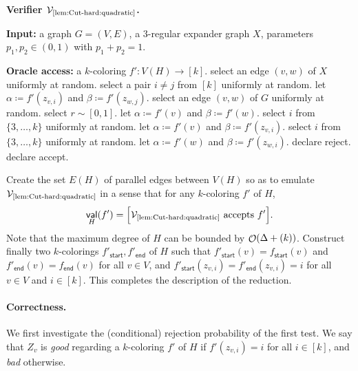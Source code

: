 \documentclass[11pt,fleqn]{article}
\renewcommand{\leq}{\leqslant}
\newcommand{\defeq}{\coloneq}
\DeclareMathOperator{\bigO}{\mathcal{O}}
\DeclareMathOperator{\val}{\mathsf{val}}
\let\poly\relax\DeclareMathOperator*{\poly}{\mathrm{poly}}
\newcommand{\sss}{\mathsf{start}}
\newcommand{\ttt}{\mathsf{end}}
\newcommand{\V}{\calV}
\newcommand{\Accept}{\textsf{accept}\xspace}
\newcommand{\Reject}{\textsf{reject}\xspace}
\newcommand{\f}{f}
\newcommand{\Vquad}{\V_{\text{\ref{lem:Cut-hard:quadratic}}}}
\newcommand{\calV}{\mathcal{V}}
\let\Pr\relax\DeclareMathOperator*{\Pr}{\mathbb{P}}
\theoremstyle{definition}
\numberwithin{equation}{section}
\begin{document}
\begin{itembox}[l]{\textbf{Verifier $\Vquad$.}}
\begin{algorithmic}[1]
    \item[\textbf{Input:}]
        a graph $G = (V,E)$,
        a $3$-regular expander graph $X$,
        parameters $p_1,p_2 \in (0,1)$ with $p_1 + p_2 = 1$.
    \item[\textbf{Oracle access:}]
        a $k$-coloring $\f' \colon V(H) \to [k]$.
     
        \State select an edge $(v,w)$ of $X$ uniformly at random.
        \State select a pair $i \neq j$ from $[k]$ uniformly at random.
        \State let $\alpha \defeq \f'(z_{v,i})$ and $\beta \defeq \f'(z_{w,j})$.
    \Else {} 
        \State select an edge $(v,w)$ of $G$ uniformly at random.
        \State select $r \sim [0,1]$.
        \If{$0 \leq r < \frac{1}{2k-1}$} 
            \State let $\alpha \defeq \f'(v)$ and $\beta \defeq \f'(w)$.
        \ElsIf{$\frac{1}{2k-1} \leq r < \frac{k-1}{2k-1}$} 
            \State select $i$ from $\{3,\ldots,k\}$ uniformly at random.
            \State let $\alpha \defeq \f'(v)$ and $\beta \defeq \f'(z_{v,i})$.
        \Else {}
            \State select $i$ from $\{3,\ldots,k\}$ uniformly at random.
            \State let $\alpha \defeq \f'(w)$ and $\beta \defeq \f'(z_{w,i})$.
        \EndIf
    \EndIf
    \If{$\alpha = \beta$}
        \State declare \Reject.
    \Else
        \State declare \Accept.
    \EndIf
\end{algorithmic}
\end{itembox}
Create the set $E(H)$ of parallel edges between $V(H)$ so as to emulate $\Vquad$
in a sense that for any $k$-coloring $\f'$ of $H$,
\begin{align}
    \val_H(\f') = \Pr\Bigl[ \Vquad \text{ accepts } \f' \Bigr].
\end{align}
Note that the maximum degree of $H$ can be bounded by $\bigO(\Delta + \poly(k))$.
Construct finally two $k$-colorings $\f'_\sss,\f'_\ttt$ of $H$ such that
$\f'_\sss(v) = \f_\sss(v)$ and $\f'_\ttt(v) = \f_\ttt(v)$
for all $v \in V$, and
$\f'_\sss(z_{v,i}) = \f'_\ttt(z_{v,i}) = i$
for all $v \in V$ and $i \in [k]$.
This completes the description of the reduction.


\paragraph{Correctness.}
We first investigate the (conditional) rejection probability of the first test.
We say that $Z_v$ is \emph{good} regarding a $k$-coloring $\f'$ of $H$ if
$\f'(z_{v,i}) = i$ for all $i \in [k]$, and \emph{bad} otherwise.
\end{document}
